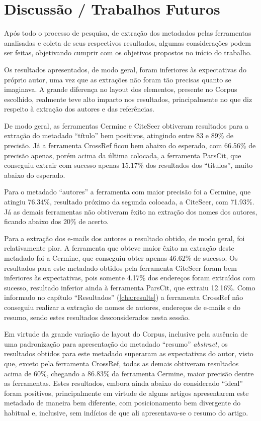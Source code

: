 
\chapter{Discussão / Trabalhos Futuros} %
\label{cha:conclusion}

Após todo o processo de pesquisa, de extração dos metadados pelas ferramentas analisadas e coleta de seus respectivos resultados, algumas considerações podem ser feitas, objetivando cumprir com os objetivos propostos no início do trabalho.

Os resultados apresentados, de modo geral, foram inferiores às expectativas do próprio autor, uma vez que as extrações não foram tão precisas quanto se imaginava. A grande diferença no layout dos elementos, presente no Corpus escolhido, realmente teve alto impacto nos resultados, principalmente no que diz respeito à extração dos autores e das referências.

De modo geral, as ferramentas Cermine e CiteSeer obtiveram resultados para a extração do metadado ``título'' bem positivos, atingindo entre 83 e 89\% de precisão. Já a ferramenta CrossRef ficou bem abaixo do esperado, com 66.56\% de precisão apenas, porém acima da última colocada, a ferramenta ParsCit, que conseguiu extrair com sucesso apenas 15.17\% dos resultados dos ``títulos'', muito abaixo do esperado.

Para o metadado ``autores'' a ferramenta com maior precisão foi a Cermine, que atingiu 76.34\%, resultado próximo da segunda colocada, a CiteSeer, com 71.93\%. Já as demais ferramentas não obtiveram êxito na extração dos nomes dos autores, ficando abaixo dos 20\% de acerto.

Para a extração dos e-mails dos autores o resultado obtido, de modo geral, foi relativamente pior. A ferramenta que obteve maior êxito na extração deste metadado foi a Cermine, que conseguiu obter apenas 46.62\% de sucesso. Os resultados para este metadado obtidos pela ferramenta CiteSeer foram bem inferiores às expectativas, pois somente 4.17\% dos endereços foram extraídos com sucesso, resultado inferior ainda à ferramenta ParsCit, que extraiu 12.16\%. Como informado no capítulo ``Resultados'' (\autoref{cha:results}) a ferramenta CrossRef não conseguiu realizar a extração de nomes de autores, endereços de e-mails e do resumo, sendo estes resultados desconsiderados nesta sessão.

Em virtude da grande variação de layout do Corpus, inclusive pela ausência de uma padronização para apresentação do metadado ``resumo'' \emph{abstract}, os resultados obtidos para este metadado superaram as expectativas do autor, visto que, exceto pela ferramenta CrossRef, todas as demais obtiveram resultados acima de 60\%, chegando a 86.83\% da ferramenta Cermine, maior precisão dentre as ferramentas. Estes resultados, embora ainda abaixo do considerado ``ideal'' foram positivos, principalmente em virtude de alguns artigos apresentarem este metadado de maneira bem diferente, com posicionamento bem divergente do habitual e, inclusive, sem indícios de que ali apresentava-se o resumo do artigo.

